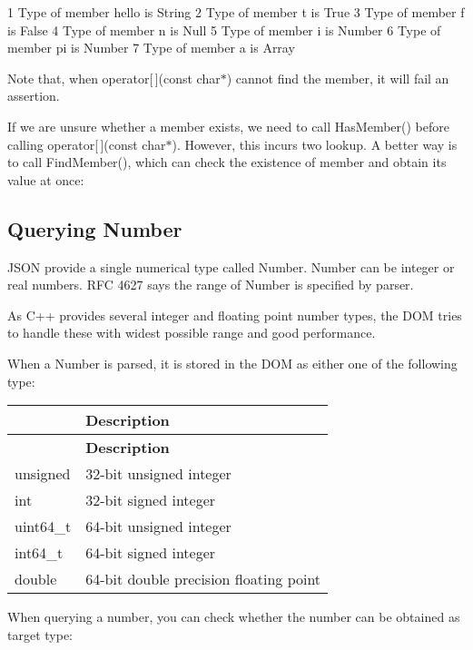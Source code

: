 \begin{DoxyCode}
1 Type of member hello is String
2 Type of member t is True
3 Type of member f is False
4 Type of member n is Null
5 Type of member i is Number
6 Type of member pi is Number
7 Type of member a is Array
\end{DoxyCode}


Note that, when {\ttfamily operator\mbox{[}$\,$\mbox{]}(const char$\ast$)} cannot find the member, it will fail an assertion.

If we are unsure whether a member exists, we need to call {\ttfamily Has\+Member()} before calling {\ttfamily operator\mbox{[}$\,$\mbox{]}(const char$\ast$)}. However, this incurs two lookup. A better way is to call {\ttfamily Find\+Member()}, which can check the existence of member and obtain its value at once\+:


\hypertarget{md_Cadriciel_Commun_Externe_RapidJSON_doc_tutorial.zh-cn_QueryNumber}{}\subsection{Querying Number}\label{md_Cadriciel_Commun_Externe_RapidJSON_doc_tutorial.zh-cn_QueryNumber}
J\+S\+ON provide a single numerical type called Number. Number can be integer or real numbers. R\+FC 4627 says the range of Number is specified by parser.

As C++ provides several integer and floating point number types, the D\+OM tries to handle these with widest possible range and good performance.

When a Number is parsed, it is stored in the D\+OM as either one of the following type\+:

\tabulinesep=1mm
\begin{longtabu} spread 0pt [c]{*2{|X[-1]}|}
\hline
{}&{\bf Description  }\\
\endfirsthead
\hline
\endfoot
\hline
{}&{\bf Description  }\\
\endhead
{\ttfamily unsigned} &32-\/bit unsigned integer \\
{\ttfamily int} &32-\/bit signed integer \\
{\ttfamily uint64\+\_\+t} &64-\/bit unsigned integer \\
{\ttfamily int64\+\_\+t} &64-\/bit signed integer \\
{\ttfamily double} &64-\/bit double precision floating point \\
\end{longtabu}
When querying a number, you can check whether the number can be obtained as target type\+:

